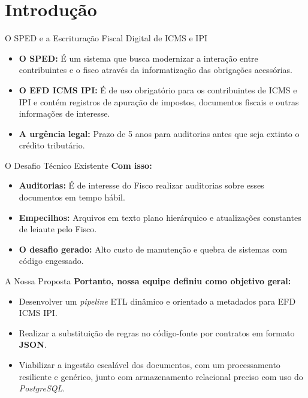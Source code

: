 \section{Introdução}

\begin{frame}{O SPED e a Escrituração Fiscal Digital de ICMS e IPI}
\begin{itemize}
    \item \textbf{O SPED:} É um sistema que busca modernizar a interação entre contribuintes e o fisco através da informatização das obrigações acessórias.
    \item \textbf{O EFD ICMS IPI:} É de uso obrigatório para os contribuintes de ICMS e IPI e contém registros de apuração de impostos, documentos fiscais e outras informações de interesse.
    \item \textbf{A urgência legal:} Prazo de 5 anos para auditorias antes que seja extinto o crédito tributário.
\end{itemize}
\end{frame}

\begin{frame}{O Desafio Técnico Existente}
\textbf{Com isso:}
\begin{itemize}
    \item \textbf{Auditorias:} É de interesse do Fisco realizar auditorias sobre esses documentos em tempo hábil.
    \item \textbf{Empecilhos:} Arquivos em texto plano hierárquico e atualizações constantes de leiaute pelo Fisco.
    \item \textbf{O desafio gerado:} Alto custo de manutenção e quebra de sistemas com código engessado.
\end{itemize}
\end{frame}

\begin{frame}{A Nossa Proposta}
\textbf{Portanto, nossa equipe definiu como objetivo geral:}
\begin{itemize}
    \item Desenvolver um \textit{pipeline} ETL dinâmico e orientado a metadados para EFD ICMS IPI.
    \item Realizar a substituição de regras no código-fonte por contratos em formato \textbf{JSON}.
    \item Viabilizar a ingestão escalável dos documentos, com um processamento resiliente e genérico, junto com armazenamento relacional preciso com uso do \textit{PostgreSQL}.
\end{itemize}
\end{frame}